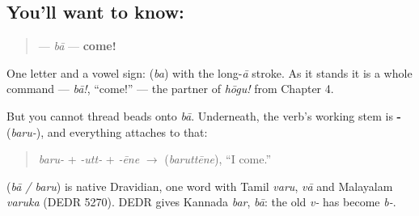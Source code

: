 \subsection*{You'll want to know: }
\begin{quote}
\textbf{} — \emph{bā} — \textbf{come!}
\end{quote}

One letter and a vowel sign: \textbf{} (\emph{ba}) with the long-\emph{ā} stroke. As it stands it is a whole command — \emph{bā!}, \textquotedblleft{}come!\textquotedblright{} — the partner of \emph{hōgu!} from Chapter 4.

But you cannot thread beads onto \emph{bā}. Underneath, the verb's working stem is \textbf{-} (\emph{baru-}), and everything attaches to that:

\begin{quote}
\emph{baru-} + \emph{-utt-} + \emph{-ēne} $\to$ \textbf{} (\emph{baruttēne}), \textquotedblleft{}I come.\textquotedblright{}
\end{quote}

\begin{cousinweb}
\textbf{} (\emph{bā / baru}) is native Dravidian, one word with Tamil \emph{varu}, \emph{vā} and Malayalam \emph{varuka} (DEDR 5270). DEDR gives Kannada \emph{bar}, \emph{bā}: the old \emph{v-} has become \emph{b-}.
\end{cousinweb}

